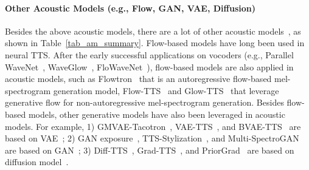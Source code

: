 \documentclass{article}
\begin{document}
\paragraph{Other Acoustic Models (e.g., Flow, GAN, VAE, Diffusion)} 
Besides the above acoustic models, there are a lot of other acoustic models~\cite{vasquez2019melnet,bi2018deep,huang2020devicetts,lee2020bidirectional,cong2021glow}, as shown in Table~\ref{tab_am_summary}. Flow-based models have long been used in neural TTS. After the early successful applications on vocoders (e.g., Parallel WaveNet~\cite{oord2018parallel}, WaveGlow~\cite{prenger2019waveglow}, FloWaveNet~\cite{kim2019flowavenet}), flow-based models are also applied in acoustic models, such as Flowtron~\cite{valle2020flowtron} that is an autoregressive flow-based mel-spectrogram generation model, Flow-TTS~\cite{miao2020flow} and Glow-TTS~\cite{kim2020glow} that leverage generative flow for non-autoregressive mel-spectrogram generation. Besides flow-based models, other generative models have also been leveraged in acoustic models. For example, 1) GMVAE-Tacotron~\cite{hsu2018hierarchical}, VAE-TTS~\cite{zhang2019learningb}, and BVAE-TTS~\cite{lee2020bidirectional} are based on   VAE~\cite{kingma2013auto}; 2) GAN exposure~\cite{guo2019new}, TTS-Stylization~\cite{ma2018neural}, and Multi-SpectroGAN~\cite{lee2020multi} are based on GAN~\cite{goodfellow2014generative}; 3) Diff-TTS~\cite{jeong2021diff}, Grad-TTS~\cite{popov2021grad}, and PriorGrad~\cite{lee2021priorgrad} are based on diffusion model~\cite{sohl2015deep,ho2020denoising}. 



\end{document}
